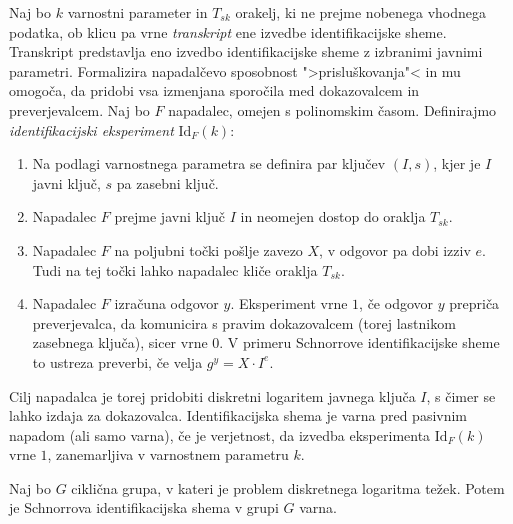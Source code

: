 \documentclass[isrm2, tisk]{fmfdelo}
\begin{document}
\begin{definicija}
\label{def:id-sec}
    Naj bo $k$ varnostni parameter in $T_{sk}$ orakelj, ki ne prejme nobenega vhodnega podatka, ob klicu
    pa vrne \textit{transkript} ene izvedbe identifikacijske sheme. Transkript predstavlja eno izvedbo
    identifikacijske sheme z izbranimi javnimi parametri. Formalizira napadalčevo sposobnost
    ">prisluškovanja"< in mu omogoča, da pridobi vsa izmenjana sporočila med dokazovalcem in
    preverjevalcem. Naj bo $F$ napadalec, omejen s polinomskim časom. Definirajmo 
    \textit{identifikacijski eksperiment} $\text{Id}_F(k)$:
    \begin{enumerate}
        \item Na podlagi varnostnega parametra se definira par ključev $(I, s)$, kjer je $I$
            javni ključ, $s$ pa zasebni ključ.
        \item Napadalec $F$ prejme javni ključ $I$ in neomejen dostop do oraklja $T_{sk}$.
        \item Napadalec $F$ na poljubni točki pošlje zavezo $X$, v odgovor pa dobi izziv $e$. Tudi
            na tej točki lahko napadalec kliče oraklja $T_{sk}$.
        \item Napadalec $F$ izračuna odgovor $y$. Eksperiment vrne $1$, če odgovor $y$ prepriča
            preverjevalca, da komunicira s pravim dokazovalcem (torej lastnikom zasebnega ključa),
            sicer vrne $0$. V primeru Schnorrove identifikacijske sheme to ustreza preverbi, če
            velja $g^y = X \cdot I^e$.
    \end{enumerate}
    Cilj napadalca je torej pridobiti diskretni logaritem javnega ključa $I$, s čimer se lahko izdaja
    za dokazovalca. Identifikacijska shema je varna pred pasivnim napadom (ali samo varna), če je
    verjetnost, da izvedba eksperimenta $\text{Id}_F(k)$ vrne $1$, zanemarljiva v varnostnem
    parametru $k$.
\end{definicija}

\begin{izrek}
\label{izrek:schnorr-id-sec}
    Naj bo $G$ ciklična grupa, v kateri je problem diskretnega logaritma težek. Potem je Schnorrova
    identifikacijska shema v grupi $G$ varna.
\end{izrek}
\end{document}
